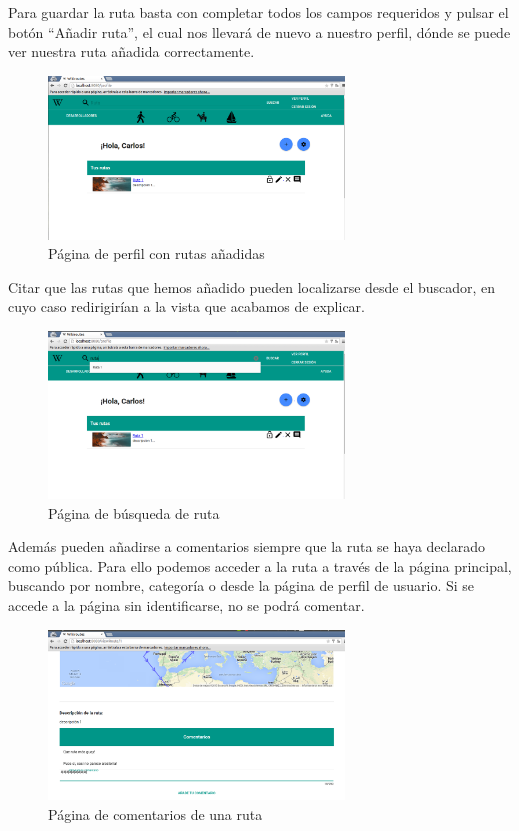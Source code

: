 \documentclass[11pt,a4paper]{article}
\begin{document}
Para guardar la ruta basta con completar todos los campos requeridos y pulsar el botón ``Añadir ruta'', el cual nos llevará de nuevo a nuestro perfil, dónde se puede ver nuestra ruta añadida correctamente.\\
\clearpage
\begin{figure}[h]
\centering
  \includegraphics[width=0.7\textwidth]{./imagenes/perfilanadir}
  \caption{Página de perfil con rutas añadidas}
  \label{fig: Página de perfil con rutas añadidas}
\end{figure}

Citar que las rutas que hemos añadido pueden localizarse desde el buscador, en cuyo caso redirigirían a la vista que acabamos de explicar.\\

\begin{figure}[h]
\centering
  \includegraphics[width=0.7\textwidth]{./imagenes/buscar}
  \caption{Página de búsqueda de ruta}
  \label{fig: Página de búsqueda de ruta}
\end{figure}

Además pueden añadirse a comentarios siempre que la ruta se haya declarado como pública. Para ello podemos acceder a la ruta a través de la página principal, buscando por nombre, categoría o desde la página de perfil de usuario. Si se accede a la página sin identificarse, no se podrá comentar.
\begin{figure}[h]
\centering
  \includegraphics[width=0.7\textwidth]{./imagenes/comentarios}
  \caption{Página de comentarios de una ruta}
  \label{fig: Página de comentarios de una ruta}
\end{figure}
\end{document}

